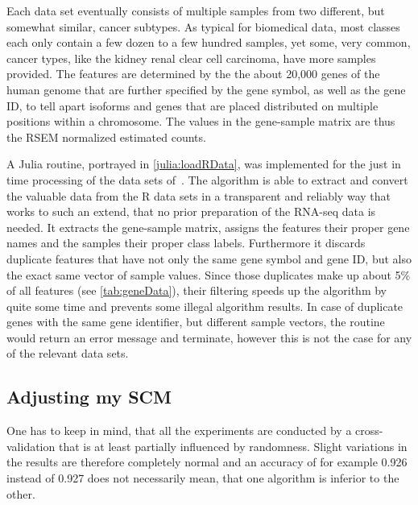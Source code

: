 Each data set eventually consists of multiple samples from two different, but somewhat similar, cancer subtypes.
As typical for biomedical data, most classes each only contain a few dozen to a few hundred samples,
yet some, very common, cancer types, like the kidney renal clear cell carcinoma, have more samples provided.
The features are determined by the the about 20,000 genes of the human genome that are further specified by the gene symbol, as well as the gene ID, to tell apart isoforms and
genes that are placed distributed on multiple positions within a chromosome.
The values in the gene-sample matrix are thus the RSEM normalized estimated counts.

A Julia routine, portrayed in \autoref{julia:loadRData}, was implemented for the just in time processing of the data sets of~\cite{lausser20}.
The algorithm is able to extract and convert the valuable data from the R data sets in a transparent and reliably way that works to such an extend,
that no prior preparation of the RNA-seq data is needed.
It extracts the gene-sample matrix, assigns the features their proper gene names and the samples their proper class labels.
Furthermore it discards duplicate features that have not only the same gene symbol and gene ID, but also the exact same vector of sample values.
Since those duplicates make up about 5\% of all features (see \autoref{tab:geneData}), their filtering speeds up the algorithm by quite some time
and prevents some illegal algorithm results.
In case of duplicate genes with the same gene identifier, but different sample vectors, the routine would
return an error message and terminate, however this is not the case for any of the relevant data sets.

\subsection{Adjusting my SCM}\label{subsec:studySCM}

One has to keep in mind, that all the experiments are conducted by a cross-validation that is at least partially influenced by randomness.
Slight variations in the results are therefore completely normal and an accuracy of for example 0.926 instead of 0.927
does not necessarily mean, that one algorithm is inferior to the other.

